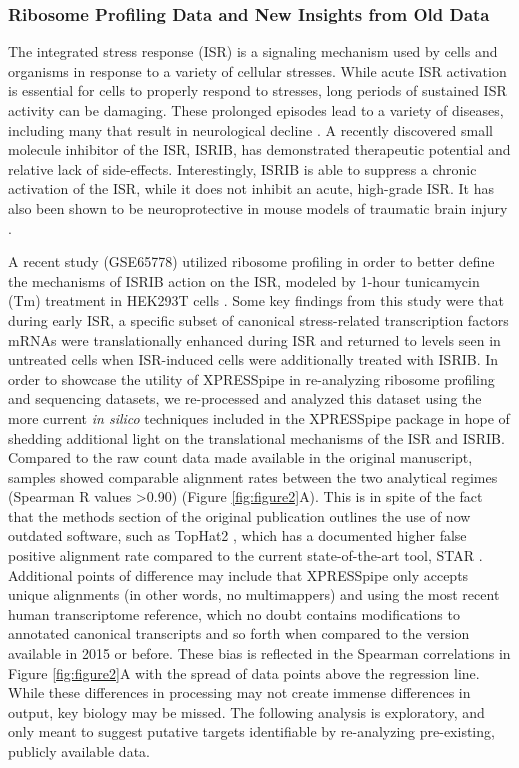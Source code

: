 \documentclass[11pt, a4paper, oneside]{article}
\begin{document}
\subsubsection{Ribosome Profiling Data and New Insights from Old Data}
The integrated stress response (ISR) is a signaling mechanism used by cells and organisms in response to a variety of cellular stresses. While acute ISR activation is essential for cells to properly respond to stresses, long periods of sustained ISR activity can be damaging. These prolonged episodes lead to a variety of diseases, including many that result in neurological decline \cite{isr_disease}. A recently discovered small molecule inhibitor of the ISR, ISRIB, has demonstrated therapeutic potential and relative lack of side-effects. Interestingly, ISRIB is able to suppress a chronic activation of the ISR, while it does not inhibit an acute, high-grade ISR. It has also been shown to be neuroprotective in mouse models of traumatic brain injury \cite{isrib_activation, isrib_structure, isrib_riboseq, isrib_neuroprotective, isrib_neuroprotective2, isrib_neuroprotective3, isrib_neuroprotective4}. \par

A recent study (GSE65778) utilized ribosome profiling in order to better define the mechanisms of ISRIB action on the ISR, modeled by 1-hour tunicamycin (Tm) treatment in HEK293T cells \cite{isrib_riboseq}. Some key findings from this study were that during early ISR, a specific subset of canonical stress-related transcription factors mRNAs were translationally enhanced during ISR and returned to levels seen in untreated cells when ISR-induced cells were additionally treated with ISRIB. In order to showcase the utility of XPRESSpipe in re-analyzing ribosome profiling and sequencing datasets, we re-processed and analyzed this dataset using the more current \textit{in silico} techniques included in the XPRESSpipe package in hope of shedding additional light on the translational mechanisms of the ISR and ISRIB. Compared to the raw count data made available in the original manuscript, samples showed comparable alignment rates between the two analytical regimes (Spearman R values \textgreater 0.90) (Figure \ref{fig:figure2}A). This is in spite of the fact that the methods section of the original publication outlines the use of now outdated software, such as TopHat2 \cite{tophat2}, which has a documented higher false positive alignment rate compared to the current state-of-the-art tool, STAR \cite{alignment_benchmark, star}. Additional points of difference may include that XPRESSpipe only accepts unique alignments (in other words, no multimappers) and using the most recent human transcriptome reference, which no doubt contains modifications to annotated canonical transcripts and so forth when compared to the version available in 2015 or before. These bias is reflected in the Spearman correlations in Figure \ref{fig:figure2}A with the spread of data points above the regression line. While these differences in processing may not create immense differences in output, key biology may be missed. The following analysis is exploratory, and only meant to suggest putative targets identifiable by re-analyzing pre-existing, publicly available data. \par
\end{document}
